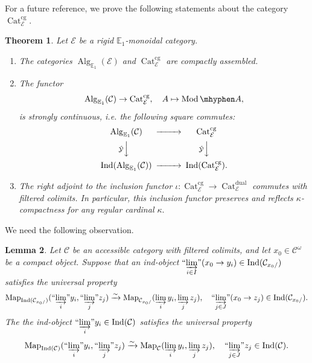 \documentclass[11pt,leqno]{amsart}
\newtheorem{theo}{Theorem}[section]
\newtheorem{lemma}[theo]{Lemma}
\numberwithin{equation}{section}
\def\Map{\operatorname{Map}}
\newcommand{\hy}{\mhyphen}
\newcommand{\indlim}[1][]{\mathop{\varinjlim}\limits_{#1}}
\newcommand{\inddlim}[1][]{{``{\indlim[#1]}"}}
\newcommand{\xto}{\xrightarrow}
\newcommand{\Cat}{\operatorname{Cat}}
\newcommand{\cg}{\operatorname{cg}}
\newcommand{\dual}{\operatorname{dual}}
\newcommand{\bE}{{\mathbb E}}
\newcommand{\cC}{{\mathcal C}}
\newcommand{\cE}{{\mathcal E}}
\newcommand{\cY}{{\mathcal Y}}
\newcommand{\Ind}{\operatorname{Ind}}
\newcommand{\Alg}{\operatorname{Alg}}
\newcommand{\Mod}{\operatorname{Mod}}
\begin{document}
For a future reference, we prove the following statements about the category $\Cat_{\cE}^{\cg}.$

\begin{theo}\label{th:Cat^cg_compactly_assembled}
Let $\cE$ be a rigid $\bE_1$-monoidal category.
\begin{enumerate}[label=(\roman*),ref=(\roman*)]
\item The categories $\Alg_{\bE_1}(\cE)$ and $\Cat_{\cE}^{\cg}$ are compactly assembled. \label{compass_over_rigid}
\item The functor
\begin{equation*}
\Alg_{\bE_1}(\cC)\to \Cat_{\cE}^{\cg},\quad A\mapsto\Mod\hy A,
\end{equation*}
is strongly continuous, i.e. the following square commutes:
\begin{equation*}
\begin{CD}
\Alg_{\bE_1}(\cC)@>>> \Cat_{\cE}^{\cg}\\
@V\hat{\cY}VV @V\hat{\cY}VV\\
\Ind(\Alg_{\bE_1}(\cC)) @>>> \Ind(\Cat_{\cE}^{\cg}).
\end{CD}
\end{equation*} \label{strcont_from_E_1_alg_to_Cat^cg}
\item The right adjoint to the inclusion functor $\iota:\Cat_{\cE}^{\cg}\to \Cat_{\cE}^{\dual}$ commutes with filtered colimits. In particular, this inclusion functor preserves and reflects $\kappa$-compactness for any regular cardinal $\kappa.$ \label{strcont_Cat^cg_to_Cat^dual}
\end{enumerate}
\end{theo}

We need the following observation.

\begin{lemma}\label{lem:sufficient_condition_for_hat_Y}
Let $\cC$ be an accessible category with filtered colimits, and let $x_0\in\cC^{\omega}$ be a compact object. Suppose that an ind-object $\inddlim[i\in I](x_0\to y_i)\in\Ind(\cC_{x_0/})$ satisfies the universal property
\begin{equation*}
\Map_{\Ind(\cC_{x_0/})}(\inddlim[i]y_i,\inddlim[j]z_j)\xto{\sim}\Map_{\cC_{x_0/}}(\indlim[i]y_i,\indlim[j]z_j),\quad \inddlim[j\in J](x_0\to z_j)\in \Ind(\cC_{x_0/}). 
\end{equation*}
The the ind-object $\inddlim[i]y_i\in\Ind(\cC)$ satisfies the universal property
\begin{equation}\label{eq:univ_property_of_ind_system}
	\Map_{\Ind(\cC)}(\inddlim[i]y_i,\inddlim[j]z_j)\xto{\sim}\Map_{\cC}(\indlim[i]y_i,\indlim[j]z_j),\quad  \inddlim[j\in J]z_j\in \Ind(\cC).
\end{equation}
\end{lemma}
\end{document}
